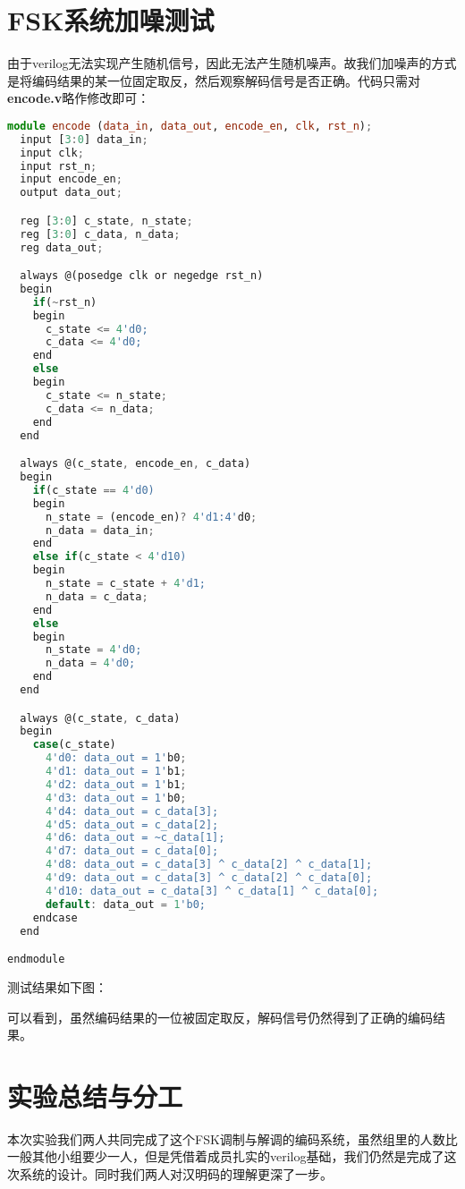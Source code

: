 \documentclass{progartcn}
\begin{document}
\section{FSK系统加噪测试}

由于verilog无法实现产生随机信号，因此无法产生随机噪声。故我们加噪声的方式是将编码结果的某一位固定取反，然后观察解码信号是否正确。代码只需对\textbf{encode.v}略作修改即可：

\begin{lstlisting}[language=TypeScript,caption={encode.v}]
module encode (data_in, data_out, encode_en, clk, rst_n);
  input [3:0] data_in;
  input clk;
  input rst_n;
  input encode_en;
  output data_out;

  reg [3:0] c_state, n_state;
  reg [3:0] c_data, n_data;
  reg data_out;

  always @(posedge clk or negedge rst_n)
  begin
    if(~rst_n)
    begin
      c_state <= 4'd0;
      c_data <= 4'd0;
    end
    else
    begin
      c_state <= n_state;
      c_data <= n_data;
    end
  end

  always @(c_state, encode_en, c_data)
  begin
    if(c_state == 4'd0)
    begin
      n_state = (encode_en)? 4'd1:4'd0;
      n_data = data_in;
    end
    else if(c_state < 4'd10)
    begin
      n_state = c_state + 4'd1;
      n_data = c_data;
    end
    else
    begin
      n_state = 4'd0;
      n_data = 4'd0;
    end
  end

  always @(c_state, c_data)
  begin
    case(c_state)
      4'd0: data_out = 1'b0;
      4'd1: data_out = 1'b1;
      4'd2: data_out = 1'b1;
      4'd3: data_out = 1'b0;
      4'd4: data_out = c_data[3];
      4'd5: data_out = c_data[2];
      4'd6: data_out = ~c_data[1];
      4'd7: data_out = c_data[0];
      4'd8: data_out = c_data[3] ^ c_data[2] ^ c_data[1];
      4'd9: data_out = c_data[3] ^ c_data[2] ^ c_data[0];
      4'd10: data_out = c_data[3] ^ c_data[1] ^ c_data[0];
      default: data_out = 1'b0;
    endcase
  end

endmodule
\end{lstlisting}


测试结果如下图：

可以看到，虽然编码结果的一位被固定取反，解码信号仍然得到了正确的编码结果。


\section{实验总结与分工}

本次实验我们两人共同完成了这个FSK调制与解调的编码系统，虽然组里的人数比一般其他小组要少一人，但是凭借着成员扎实的verilog基础，我们仍然是完成了这次系统的设计。同时我们两人对汉明码的理解更深了一步。
\end{document}
